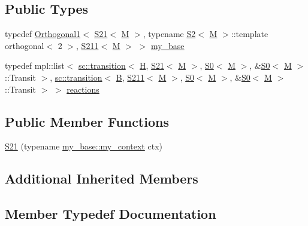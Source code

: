 \subsection*{Public Types}
\begin{DoxyCompactItemize}
\item 
typedef \mbox{\hyperlink{struct_orthogonal1}{Orthogonal1}}$<$ \mbox{\hyperlink{struct_s21}{S21}}$<$ \mbox{\hyperlink{struct_m}{M}} $>$, typename \mbox{\hyperlink{struct_s2}{S2}}$<$ \mbox{\hyperlink{struct_m}{M}} $>$\+::template orthogonal$<$ 2 $>$, \mbox{\hyperlink{struct_s211}{S211}}$<$ \mbox{\hyperlink{struct_m}{M}} $>$ $>$ \mbox{\hyperlink{struct_s21_a68aa19cac7d8f172f0f12e855642b983}{my\+\_\+base}}
\item 
typedef mpl\+::list$<$ \mbox{\hyperlink{classboost_1_1statechart_1_1transition}{sc\+::transition}}$<$ \mbox{\hyperlink{struct_h}{H}}, \mbox{\hyperlink{struct_s21}{S21}}$<$ \mbox{\hyperlink{struct_m}{M}} $>$, \mbox{\hyperlink{struct_s0}{S0}}$<$ \mbox{\hyperlink{struct_m}{M}} $>$, \&\mbox{\hyperlink{struct_s0}{S0}}$<$ \mbox{\hyperlink{struct_m}{M}} $>$\+::Transit $>$, \mbox{\hyperlink{classboost_1_1statechart_1_1transition}{sc\+::transition}}$<$ \mbox{\hyperlink{struct_b}{B}}, \mbox{\hyperlink{struct_s211}{S211}}$<$ \mbox{\hyperlink{struct_m}{M}} $>$, \mbox{\hyperlink{struct_s0}{S0}}$<$ \mbox{\hyperlink{struct_m}{M}} $>$, \&\mbox{\hyperlink{struct_s0}{S0}}$<$ \mbox{\hyperlink{struct_m}{M}} $>$\+::Transit $>$ $>$ \mbox{\hyperlink{struct_s21_ab1a7f8bf2e6fbc04a7b4c23ac60f6f4c}{reactions}}
\end{DoxyCompactItemize}
\subsection*{Public Member Functions}
\begin{DoxyCompactItemize}
\item 
\mbox{\hyperlink{struct_s21_a633679618bd39ff85376a36429815c16}{S21}} (typename \mbox{\hyperlink{struct_orthogonal1_a8cee9db1dad468ee5f8e34871d7a4ae2}{my\+\_\+base\+::my\+\_\+context}} ctx)
\end{DoxyCompactItemize}
\subsection*{Additional Inherited Members}


\subsection{Member Typedef Documentation}
\mbox{\label{struct_s21_a68aa19cac7d8f172f0f12e855642b983}} 
